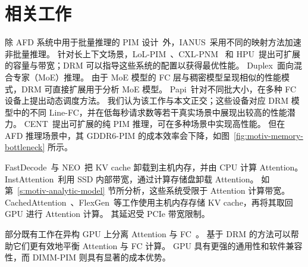 \section{相关工作}
\label{subs:motiv-related-work}

除 AFD 系统中用于批量推理的 PIM 设计~\cite{park2024attacc,heo2024neupims}外，IANUS~\cite{seo2024ianus,li2025h2llm}采用不同的映射方法加速非批量推理。
针对长上下文场景，LoL-PIM~\cite{kwon2025lolpim}、CXL-PNM~\cite{park2024cxlpnm} 和 HPU~\cite{rhee2025hpu}提出可扩展的容量与带宽；DRM 可以指导这些系统的配置以获得最优性能。
Duplex~\cite{yun2024duplex}面向混合专家（MoE）推理。
由于 MoE 模型的 FC 层与稠密模型呈现相似的性能模式，DRM 可直接扩展用于分析 MoE 模型。
Papi~\cite{he2025papi}针对不同批大小，在多种 FC 设备上提出动态调度方法。
我们认为该工作与本文正交；这些设备对应 DRM 模型中的不同 Line-FC，并在低每秒请求数等若干真实场景中展现出较高的性能潜力。
CENT~\cite{gu2025cent}提出可扩展的纯 PIM 推理，可在多种场景中实现高性能。
但在 AFD 推理场景中，其 GDDR6-PIM 的成本效率会下降，如图~\ref{fig:motiv-memory-bottleneck} 所示。

FastDecode~\cite{he2024fastdecode}与 NEO~\cite{jiang2024neo}把 KV cache 卸载到主机内存，并由 CPU 计算 Attention。
InstAttention~\cite{pan2025instattention}利用 SSD 内部带宽，通过计算存储盘卸载 Attention。
如第~\ref{s:motiv-analytic-model} 节所分析，这些系统受限于 Attention 计算带宽。
CachedAttention~\cite{Gao2024cachedattention}、FlexGen~\cite{sheng2023flexgen}等工作使用主机内存存储 KV cache，再将其取回 GPU 进行 Attention 计算。
其延迟受 PCIe 带宽限制。

部分既有工作在异构 GPU 上分离 Attention 与 FC~\cite{step3blog,step3system,zhu2025megascaleinfer}。
基于 DRM 的方法可以帮助它们更有效地平衡 Attention 与 FC 计算。
GPU 具有更强的通用性和软件兼容性，而 DIMM-PIM 则具有显著的成本优势。

